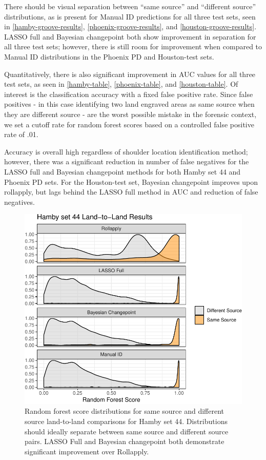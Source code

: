 \documentclass[12pt]{article}
\begin{document}
There should be visual separation between ``same source'' and
``different source'' distributions, as is present for Manual ID
predictions for all three test sets, seen in
\autoref{hamby-groove-results}, \autoref{phoenix-groove-results}, and
\autoref{houston-groove-results}. LASSO full and Bayesian changepoint
both show improvement in separation for all three test sets; however,
there is still room for improvement when compared to Manual ID
distributions in the Phoenix PD and Houston-test sets.

Quantitatively, there is also significant improvement in AUC values for
all three test sets, as seen in \autoref{hamby-table},
\autoref{phoenix-table}, and \autoref{houston-table}. Of interest is the
classification accuracy with a fixed false positive rate. Since false
positives - in this case identifying two land engraved areas as same
source when they are different source - are the worst possible mistake
in the forensic context, we set a cutoff rate for random forest scores
based on a controlled false positive rate of .01.

Accuracy is overall high regardless of shoulder location identification
method; however, there was a significant reduction in number of false
negatives for the LASSO full and Bayesian changepoint methods for both
Hamby set 44 and Phoenix PD sets. For the Houston-test set, Bayesian
changepoint improves upon rollapply, but lags behind the LASSO full
method in AUC and reduction of false negatives.

\begin{figure}
\centering
\includegraphics{writeup_files/figure-latex/hamby-groove-results-1.pdf}
\caption{\label{hamby-groove-results}Random forest score distributions
for same source and different source land-to-land comparisons for Hamby
set 44. Distributions should ideally separate between same source and
different source pairs. LASSO Full and Bayesian changepoint both
demonstrate significant improvement over Rollapply.}
\end{figure}
\end{document}
